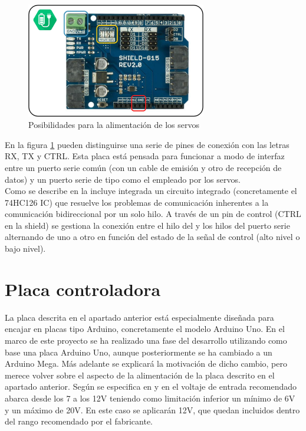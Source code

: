 	\begin{figure}[H]
		\centering
		\includegraphics[width=0.7\textwidth]{figuras/Imagenes_Electronica/alimentacion-shield.jpg}
		\caption{Posibilidades para la alimentación de los servos}
		\label{fig:Electronica:alimentacion-shield}
	\end{figure}
		
	En la figura \ref{fig:Electronica:alimentacion-shield} pueden distinguirse una serie de pines de conexión con las letras RX, TX y CTRL. Esta placa está pensada para funcionar a modo de interfaz entre un puerto serie común (con un cable de emisión y otro de recepción de datos) y un puerto serie de tipo  como el empleado por los servos.
	\\
	
	Como se describe en \cite{CytronTechnologies2012} la  incluye integrada un circuito integrado (concretamente el 74HC126 IC) que resuelve los problemas de comunicación inherentes a la comunicación bidireccional por un solo hilo. A través de un pin de control (CTRL en la shield) se gestiona la conexión entre el hilo del  y los hilos del puerto serie alternando de uno a otro en función del estado de la señal de control (alto nivel o bajo nivel).
	
\section{Placa controladora}
	
	La placa  descrita en el apartado anterior está especialmente diseñada para encajar en placas tipo Arduino, concretamente el modelo Arduino Uno. En el marco de este proyecto se ha realizado una fase del desarrollo utilizando como base una placa Arduino Uno, aunque posteriormente se ha cambiado a un Arduino Mega. Más adelante se explicará la motivación de dicho cambio, pero merece volver sobre el aspecto de la alimentación de la placa descrito en el apartado anterior. Según se especifica en \cite{arduinoUno} y en \cite{arduinoMega} el voltaje de entrada recomendado abarca desde los 7 a los 12V teniendo como limitación inferior un mínimo de 6V y un máximo de 20V. En este caso se aplicarán 12V, que quedan incluidos dentro del rango recomendado por el fabricante.
	\\
	
